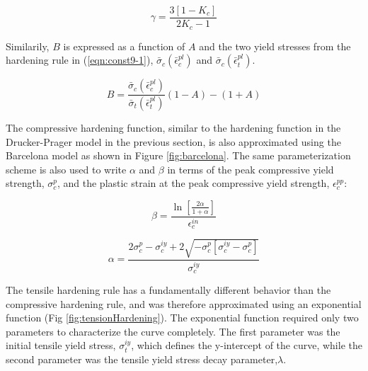 \begin{equation}
\gamma = \frac{3\left[1-K_c \right]}{2K_c-1}
\label{eqn:param1-3}
\end{equation}

Similarily, $B$ is expressed as a function of $A$ and the two yield stresses from the hardening rule in (\ref{eqn:const9-1}), $\bar{\sigma}_c\left(\bar{\epsilon}^{pl}_c\right)$ and $\bar{\sigma}_c\left(\bar{\epsilon}^{pl}_t\right)$.

\begin{equation}
B = \frac{\bar{\sigma}_c\left(\bar{\epsilon}^{pl}_c\right)}{\bar{\sigma}_t\left(\bar{\epsilon}^{pl}_t\right)}\left(1-A \right )-\left( 1+A \right)
\label{eqn:param1-2}
\end{equation}

The compressive hardening function, similar to the hardening function in the Drucker-Prager model in the previous section, is also approximated using the Barcelona model as shown in Figure \ref{fig:barcelona}. The same parameterization scheme is also used to write $\alpha$ and $\beta$ in terms of the peak compressive yield strength, $\sigma_{c}^{p}$, and the plastic strain at the peak compressive yield strength, $\epsilon_c^{pp}$:

\begin{equation}
\beta=\frac{\ln\left[\frac{2\alpha}{1+\alpha} \right ]}{\epsilon_c^{in}}
\label{eqn:c1}
\end{equation}

\begin{equation}
\alpha =\frac{2\sigma_c^{p}-\sigma_c^{iy}+2\sqrt{-\sigma_c^p\left[\sigma_c^{iy}-\sigma_c^p \right ]}}{\sigma_c^{iy}}
\label{eqn:c2}
\end{equation}

The tensile hardening rule has a fundamentally different behavior than the compressive hardening rule, and was therefore approximated using an exponential function (Fig \ref{fig:tensionHardening}). The exponential function required only two parameters to characterize the curve completely. The first parameter was the initial tensile yield stress, $\sigma_{t}^{iy}$, which defines the y-intercept of the curve, while the second parameter was the tensile yield stress decay parameter,$\lambda$.

